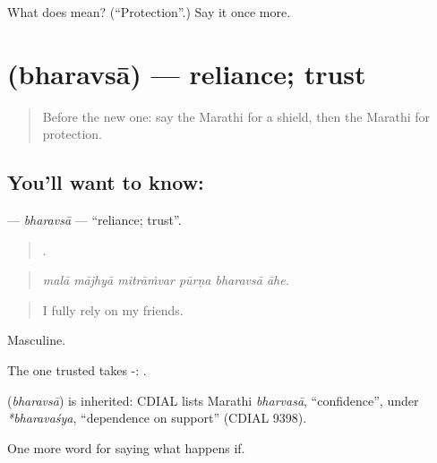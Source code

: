 \begin{tcolorbox}[breakable,colback=teal!4,colframe=teal!35!black,title={Before you move on}]
What does  mean? (\textquotedblleft{}Protection\textquotedblright{}.) Say it once more.
\end{tcolorbox}
\section[\texorpdfstring{\mr{भरवसा} (bharavsā)}{भरवसा (bharavsā)}]{ (bharavsā) — reliance; trust}

\label{lesson:MR-C549-bharavsa}



\begin{quote}
Before the new one: say the Marathi for a shield, then the Marathi for protection.
\end{quote}

\subsection*{You'll want to know: }
\textbf{} — \emph{bharavsā} — \textquotedblleft{}reliance; trust\textquotedblright{}.

\begin{quote}
     .
\end{quote}

\begin{quote}
\emph{malā mājhyā mitrāṁvar pūrṇa bharavsā āhe.}
\end{quote}

\begin{quote}
I fully rely on my friends.
\end{quote}

Masculine.

The one trusted takes -:  .

\begin{cousinweb}
\textbf{} (\emph{bharavsā}) is inherited: CDIAL lists Marathi \emph{bharvasā}, \textquotedblleft{}confidence\textquotedblright{}, under \emph{*bharavaśya}, \textquotedblleft{}dependence on support\textquotedblright{} (CDIAL 9398).
\end{cousinweb}

\begin{grammarlens}[title={What you've built}]
One more word for saying what happens if.
\end{grammarlens}

